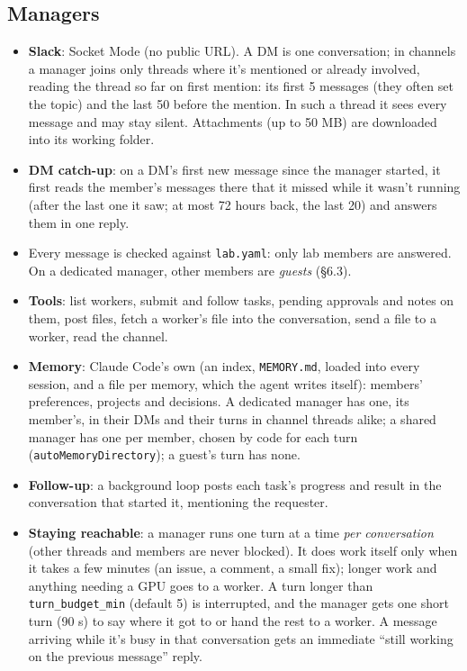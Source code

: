 \documentclass[11pt]{article}
\newcommand{\code}[1]{\texttt{#1}}
\begin{document}
\subsection{Managers}
\begin{itemize}
  \item \textbf{Slack}: Socket Mode (no public URL). A DM is one conversation; in channels a
    manager joins only threads where it's mentioned or already involved, reading the thread
    so far on first mention: its first 5 messages (they often set the topic) and the
    last 50 before the mention. In such a thread it sees every message and
    may stay silent. Attachments (up to 50 MB) are downloaded into its working folder.
  \item \textbf{DM catch-up}: on a DM's first new message since the manager started, it
    first reads the member's messages there that it missed while it wasn't running (after
    the last one it saw; at most 72 hours back, the last 20) and answers them in one reply.
  \item Every message is checked against \code{lab.yaml}: only lab members are answered. On
    a dedicated manager, other members are \emph{guests} (\S6.3).
  \item \textbf{Tools}: list workers, submit and follow tasks, pending approvals and notes
    on them, post files, fetch a worker's file into the conversation, send a file to a
    worker, read the channel.
  \item \textbf{Memory}: Claude Code's own (an index, \code{MEMORY.md}, loaded into every
    session, and a file per memory, which the agent writes itself): members' preferences,
    projects and decisions. A dedicated manager has one, its member's, in their DMs and their
    turns in channel threads alike; a shared manager has one per member, chosen by code for
    each turn (\code{autoMemoryDirectory}); a guest's turn has none.
  \item \textbf{Follow-up}: a background loop posts each task's progress and result in the
    conversation that started it, mentioning the requester.
  \item \textbf{Staying reachable}: a manager runs one turn at a time \emph{per
    conversation} (other threads and members are never blocked). It does work itself only
    when it takes a few minutes (an issue, a comment, a small fix); longer work and
    anything needing a GPU goes to a worker. A turn longer than \code{turn\_budget\_min}
    (default 5) is interrupted, and the manager gets one short turn (90 s) to say where it
    got to or hand the rest to a worker. A message arriving while it's busy in that
    conversation gets an immediate ``still working on the previous message'' reply.
\end{itemize}
\end{document}
